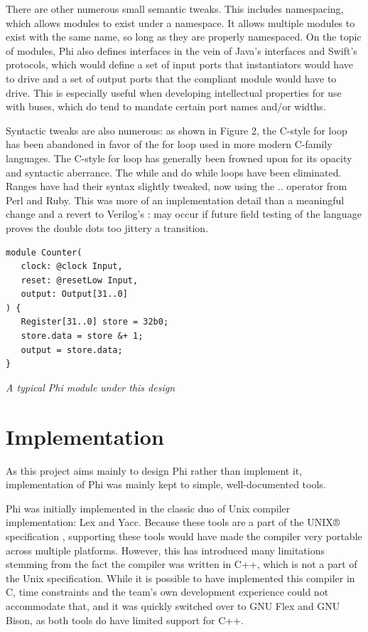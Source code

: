 \documentclass[10pt, two column]{article}
\theoremstyle{definition}
\begin{document}
There are other numerous small semantic tweaks. This includes namespacing, which allows modules to exist under a namespace. It allows multiple modules to exist with the same name, so long as they are properly namespaced. On the topic of modules, Phi also defines interfaces in the vein of Java’s 
interfaces and Swift’s protocols, which would define a set of input ports that instantiators would have to drive and a set of output ports that the compliant module would have to drive. This is especially useful when developing intellectual properties for use with buses, which do tend to mandate certain port names and/or widths.\newline

Syntactic tweaks are also numerous: as shown in Figure 2, the C-style for loop has been abandoned in favor of the for loop used in more modern C-family languages. The C-style for loop has generally been frowned upon for its opacity and syntactic aberrance. The while and do while loops have been eliminated. Ranges have had their syntax slightly tweaked, now using the .. operator from Perl and Ruby. This was more of an implementation detail than a meaningful change and a revert to Verilog’s : may occur if future field testing of the language proves the double dots too jittery a transition.\newline

\begin{lstlisting}
module Counter(
   clock: @clock Input,
   reset: @resetLow Input,
   output: Output[31..0]
) {
   Register[31..0] store = 32b0;
   store.data = store &+ 1;
   output = store.data;
}
\end{lstlisting}
\begin{center}
\textit{A typical Phi module under this design}
\end{center}

\section{Implementation}

As this project aims mainly to design Phi rather than implement it, implementation of Phi was mainly kept to simple, well-documented tools.\newline

Phi was initially implemented in the classic duo of Unix compiler implementation: Lex and Yacc. Because these tools are a part of the UNIX® specification \cite{openGroupBaseSpecif_2018}, supporting these tools would have made the compiler very portable across multiple platforms. However, this has introduced many limitations stemming from the fact the compiler was written in C++, which is not a part of the Unix specification. While it is possible to have implemented this compiler in C, time constraints and the team’s own development experience could not accommodate that, and it was quickly switched over to GNU Flex and GNU Bison, as both tools do have limited support for C++. \newline
\end{document}
